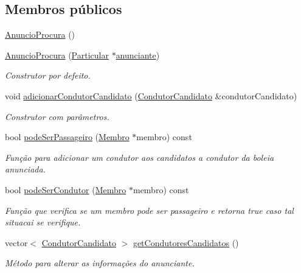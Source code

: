 \subsection*{Membros públicos}
\begin{DoxyCompactItemize}
\item 
\hyperlink{class_anuncio_procura_af0d631aecbb747fb64ad8a80f50944b0}{Anuncio\+Procura} ()
\item 
\hyperlink{class_anuncio_procura_a03743cdc7492d168d554b8dcd56982aa}{Anuncio\+Procura} (\hyperlink{class_particular}{Particular} $\ast$\hyperlink{class_anuncio_a58250bfc8ab82d4308839b1e26213a0f}{anunciante})
\begin{DoxyCompactList}\small\item\em Construtor por defeito. \end{DoxyCompactList}\item 
void \hyperlink{class_anuncio_procura_a13d30275e62d58a007baed6d53635a22}{adicionar\+Condutor\+Candidato} (\hyperlink{struct_condutor_candidato}{Condutor\+Candidato} \&condutor\+Candidato)
\begin{DoxyCompactList}\small\item\em Construtor com parâmetros. \end{DoxyCompactList}\item 
bool \hyperlink{class_anuncio_procura_aab615cb1457ec3784d55149d44cdc458}{pode\+Ser\+Passageiro} (\hyperlink{class_membro}{Membro} $\ast$membro) const 
\begin{DoxyCompactList}\small\item\em Função para adicionar um condutor aos candidatos a condutor da boleia anunciada. \end{DoxyCompactList}\item 
bool \hyperlink{class_anuncio_procura_aa7689f1ae7175e99b144c48422231e17}{pode\+Ser\+Condutor} (\hyperlink{class_membro}{Membro} $\ast$membro) const 
\begin{DoxyCompactList}\small\item\em Função que verifica se um membro pode ser passageiro e retorna true caso tal situacai se verifique. \end{DoxyCompactList}\item 
vector$<$ \hyperlink{struct_condutor_candidato}{Condutor\+Candidato} $>$ \hyperlink{class_anuncio_procura_a5ceb65dc092e5fd576dbc5db90ef6187}{get\+Condutores\+Candidatos} ()
\begin{DoxyCompactList}\small\item\em Método para alterar as informações do anunciante. \end{DoxyCompactList}\item 

\end{DoxyCompactItemize}
